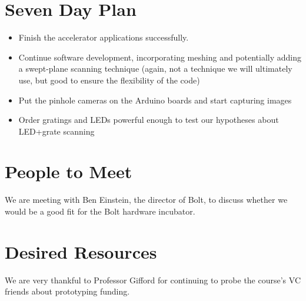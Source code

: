 \documentclass[10pt]{article}
\begin{document}
\section{Seven Day Plan}
\begin{itemize}
\item Finish the accelerator applications successfully.
\item Continue software development, incorporating meshing and potentially
  adding a swept-plane scanning technique (again, not a
  technique we will ultimately use, but good to ensure the flexibility of the
  code)
\item Put the pinhole cameras on the Arduino boards and start capturing images
\item Order gratings and LEDs powerful enough to test our hypotheses about
  LED+grate scanning
\end{itemize}

\section{People to Meet}
We are meeting with Ben Einstein, the director of Bolt, to discuss whether we
would be a good fit for the Bolt hardware incubator. 

\section{Desired Resources}
We are very thankful to Professor Gifford for continuing to probe the course's
VC friends about prototyping funding.
\end{document}
